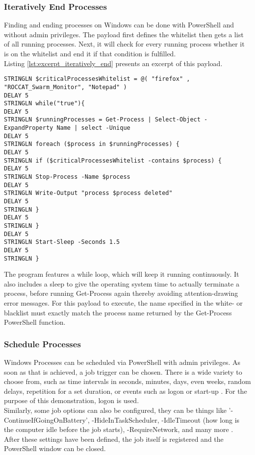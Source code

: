 \subsubsection{Iteratively End Processes}

Finding and ending processes on Windows can be done with PowerShell and without admin privileges. The payload first defines the whitelist then gets a list of all running processes. Next, it will check for every running process whether it is on the whitelist and end it if that condition is fulfilled. \\
Listing \ref{lst:excerpt_iteratively_end} presents an excerpt of this payload.

\begin{lstlisting}[caption={Exceprt: a PowerShell looop that ends a running process if it is contained in the whitelist}, label={lst:excerpt_iteratively_end}, captionpos=b]
STRINGLN $criticalProcessesWhitelist = @( "firefox" , "ROCCAT_Swarm_Monitor", "Notepad" )
DELAY 5
STRINGLN while("true"){
DELAY 5
STRINGLN $runningProcesses = Get-Process | Select-Object -ExpandProperty Name | select -Unique
DELAY 5
STRINGLN foreach ($process in $runningProcesses) {
DELAY 5
STRINGLN if ($criticalProcessesWhitelist -contains $process) {
DELAY 5
STRINGLN Stop-Process -Name $process
DELAY 5
STRINGLN Write-Output "process $process deleted"
DELAY 5
STRINGLN }
DELAY 5
STRINGLN }
DELAY 5
STRINGLN Start-Sleep -Seconds 1.5
DELAY 5
STRINGLN }
\end{lstlisting}

The program features a while loop, which will keep it running continuously. It also includes a sleep to give the operating system time to actually terminate a process, before running Get-Process again thereby avoiding attention-drawing error messages. For this payload to execute, the name specified in the white- or blacklist must exactly match the process name returned by the Get-Process PowerShell function.



\subsubsection{Schedule Processes}

Windows Processes can be scheduled via PowerShell with admin privileges. As soon as that is achieved, a job trigger can be chosen. There is a wide variety to choose from, such as time intervals in seconds, minutes, days, even weeks, random delays, repetition for a set duration, or events such as logon or start-up \cite{sdwheelerNewJobTriggerPSScheduledJobPowerShell}.
For the purpose of this demonstration, logon is used. \\
Similarly, some job options can also be configured, they can be things like '-ContinueIfGoingOnBattery', -HideInTaskScheduler, -IdleTimeout (how long is the computer idle before the job starts), -RequireNetwork, and many more \cite{sdwheelerSetScheduledJobOptionPSScheduledJobPowerShell}. \\
After these settings have been defined, the job itself is registered and the PowerShell window can be closed. \\


